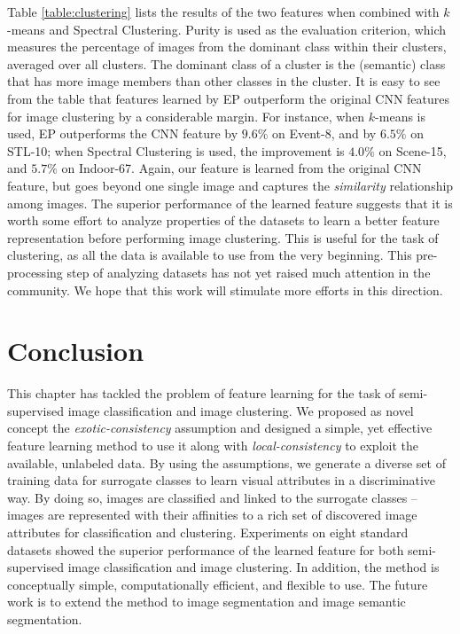 Table \ref{table:clustering} lists the results of the two features
when combined with $k$-means and Spectral Clustering.  Purity is used
as the evaluation criterion, which measures the percentage of images
from the dominant class within their clusters, averaged over all
clusters. The dominant class of a cluster is the (semantic) class that
has more image members than other classes in the cluster.  It is easy
to see from the table that features learned by EP outperform the
original CNN features for image clustering by a considerable
margin. For instance, when $k$-means is used, EP outperforms the CNN
feature by $9.6\%$ on Event-8, and by $6.5\%$ on STL-10; when Spectral
Clustering is used, the improvement is $4.0\%$ on Scene-15, and
$5.7\%$ on Indoor-67.  Again, our feature is learned from the original
CNN feature, but goes beyond one single image and captures the
\emph{similarity} relationship among images. The superior performance
of the learned feature suggests that it is worth some effort to
analyze properties of the datasets to learn a better feature
representation before performing image clustering. This is useful for the task of clustering, as all the data is
available to use from the very beginning. This pre-processing step of
analyzing datasets has not yet raised much attention in the community. We
hope that this work will stimulate more efforts in this direction.


\section{Conclusion} 
\label{en:sec:conclusion}
This chapter has tackled the problem of feature learning for the task of
semi-supervised image classification and image clustering.  We
proposed as novel concept the \emph{exotic-consi\-stency} assumption
and designed a simple, yet effective feature learning method to use it
along with \emph{local-consistency} to exploit the available,
unlabeled data. By using the assumptions, we generate a diverse set of
training data for surrogate classes to learn visual attributes in a
discriminative way.  By doing so, images are classified and linked to
the surrogate classes -- images are represented with their affinities
to a rich set of discovered image attributes for classification and
clustering. Experiments on eight standard datasets showed the superior
performance of the learned feature for both semi-supervised image
classification and image clustering. In addition, the method is
conceptually simple, computationally efficient, and flexible to use.
The future work is to extend the method to image segmentation and
image semantic segmentation.


